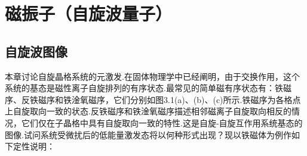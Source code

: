 %
%
\chapter{磁振子（自旋波量子）}

\section{自旋波图像}

本章讨论自旋晶格系统的元激发.在固体物理学中已经阐明，由于交换作用，这个系统的基态是磁性离子自旋排列的有序状态.最常见的简单磁有序状态有：铁磁序、反铁磁序和铁淦氧磁序，它们分别如图3.1(a)、(b)、(c)所示.铁磁序为各格点上自旋取向一致的状态.反铁磁序和铁淦氧磁序描述相邻磁离子自旋取向相反的情况，它们仅在子晶格中具有自旋取向一致的特性.这是自旋-自旋互作用系统基态的图像.试问系统受微扰后的低能量激发态将以何种形式出现？现以铁磁体为例作如下定性说明：

